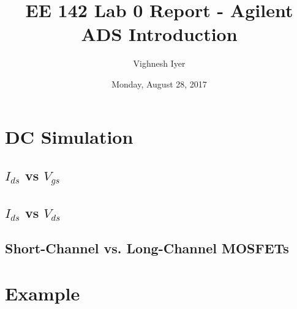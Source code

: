 \documentclass[11pt]{article}
\begin{document}
\title{EE 142 Lab 0 Report - Agilent ADS Introduction}

\author{Vighnesh Iyer}
\date{Monday, August 28, 2017}
\maketitle

\section{DC Simulation}
\subsection{$I_{ds}$ vs $V_{gs}$}

\subsection{$I_{ds}$ vs $V_{ds}$}

\subsection{Short-Channel vs. Long-Channel MOSFETs}

\newpage
\appendix
\section{Example} \label{ex}
\end{document}
